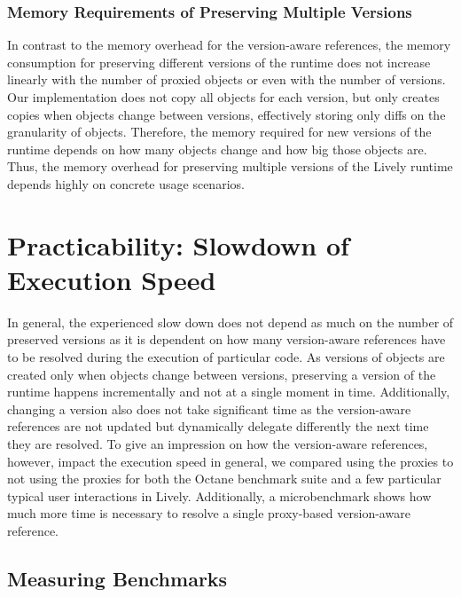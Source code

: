 \subsubsection{Memory Requirements of Preserving Multiple Versions}

In contrast to the memory overhead for the version-aware references, the memory consumption for preserving different versions of the runtime does not increase linearly with the number of proxied objects or even with the number of versions.
Our implementation does not copy all objects for each version, but only creates copies when objects change between versions, effectively storing only diffs on the granularity of objects.
Therefore, the memory required for new versions of the runtime depends on how many objects change and how big those objects are.
Thus, the memory overhead for preserving multiple versions of the Lively runtime depends highly on concrete usage scenarios.






\section{Practicability: Slowdown of Execution Speed} \label{sec:DISCUSSION:3}



In general, the experienced slow down does not depend as much on the number of preserved versions as it is dependent on how many version-aware references have to be resolved during the execution of particular code.
As versions of objects are created only when objects change between versions, preserving a version of the runtime happens incrementally and not at a single moment in time.
Additionally, changing a version also does not take significant time as the version-aware references are not updated but dynamically delegate differently the next time they are resolved.
To give an impression on how the version-aware references, however, impact the execution speed in general, we compared using the proxies to not using the proxies for both the Octane benchmark suite and a few particular typical user interactions in Lively.
Additionally, a microbenchmark shows how much more time is necessary to resolve a single proxy-based version-aware reference.


\subsection{Measuring Benchmarks}

